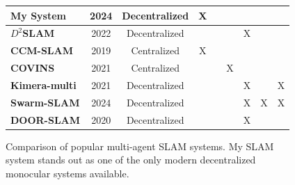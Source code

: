 \begin{figure}[h]
{\begin{tabular}{ |l|c|c|c|c|c|c|c|c| }
            \hline
            \textbf{My System}                                     & 2024                           & Decentralized          & X                                   &                                  &                        &                        &                        &                        \\
            \hline
            \textbf{$D^2$SLAM \autocite{xu2022d}}                  & 2022                           & Decentralized          &                                     &                                  &                        & X                      &                        &                        \\
            \hline
            \textbf{CCM-SLAM \autocite{schmuck2019ccm}}            & 2019                           & Centralized            & X                                   &                                  &                        &                        &                        &                        \\
            \hline
            \textbf{COVINS \autocite{schmuck2021covins}}           & 2021                           & Centralized            &                                     &                                  & X                      &                        &                        &                        \\
            \hline
            \textbf{Kimera-multi \autocite{tian22tro_kimeramulti}} & 2021                           & Decentralized          &                                     &                                  &                        & X                      &                        & X                      \\
            \hline
            \textbf{Swarm-SLAM \autocite{lajoieSwarmSLAM}}         & 2024                           & Decentralized          &                                     &                                  &                        & X                      & X                      & X                      \\
            \hline
            \textbf{DOOR-SLAM \autocite{Lajoie2020DOORSLAM}}       & 2020                           & Decentralized          &                                     &                                  &                        & X                      &                        &                        \\
            \hline
        \end{tabular}
    }

    \caption{Comparison of popular multi-agent SLAM systems. My SLAM system stands out as one of the only modern decentralized monocular systems available\protect\footnotemark[1].}
    \label{fig:related-work-sensor-configurations}
\end{figure}

